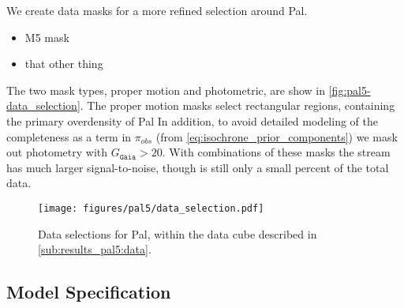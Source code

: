 \documentclass[twocolumn]{aastex631}
\newcommand{\stream}[1]{#1}
\newcommand{\dataarchive}[1]{\texttt{#1}}
\newcommand{\Gaia}{\dataarchive{Gaia}}
\newcommand{\mcal}[1]{\mathcal{#1}}
\newcommand{\prior}{\mcal{\pi}}
\newcommand{\unit}[1]{[\text{#1}]}
\begin{document}
        We create data masks for a more refined selection around \stream{Pal}.
        
        \begin{itemize}
            \item M5 mask
            \item that other thing
        \end{itemize}
        
        The two mask types, proper motion and photometric, are show in
        \autoref{fig:pal5-data_selection}.  The proper motion masks select
        rectangular regions, containing the primary overdensity of \stream{Pal}
        In
        addition, to avoid detailed modeling of the completeness as a term in
        $\prior_{obs}$ (from \autoref{eq:isochrone_prior_components}) we mask out
        photometry with $G_{\Gaia{}} > 20$.  With combinations of these masks
        the stream has much larger signal-to-noise, though is still only a small
        percent of the total data.

        \begin{figure*}[h]
            \centering
            \texttt{[image: figures/pal5/data\_selection.pdf]}
            \caption{%
                Data selections for \stream{Pal}, within the data cube
                described in \autoref{sub:results_pal5:data}.
            }
            \label{fig:pal5-data_selection}
        \end{figure*}
        


    \subsection{Model Specification} \label{sub:results_pal5:model}
\end{document}
